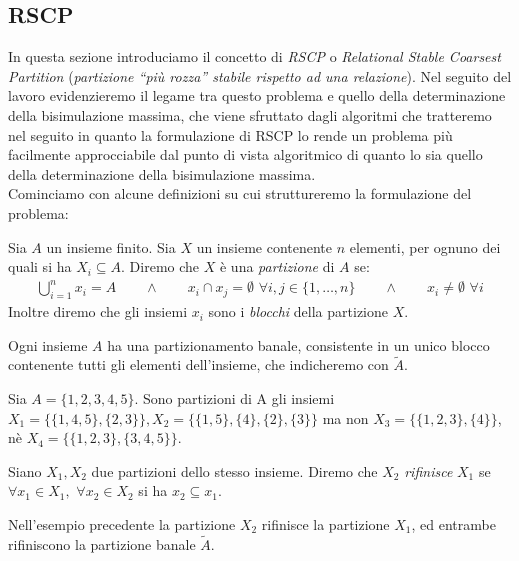 \subsection{RSCP}
In questa sezione introduciamo il concetto di \emph{RSCP} o \emph{Relational Stable Coarsest Partition} (\emph{partizione ``più rozza'' stabile rispetto ad una relazione}).
Nel seguito del lavoro evidenzieremo il legame tra questo problema e quello della determinazione della bisimulazione massima, che viene sfruttato dagli algoritmi
che tratteremo nel seguito in quanto la formulazione di RSCP lo rende un problema più facilmente approcciabile dal punto di vista algoritmico di quanto lo sia quello della determinazione della
bisimulazione massima.\\
Cominciamo con alcune definizioni su cui struttureremo la formulazione del problema:
\begin{definition}
    Sia $A$ un insieme finito. Sia $X$ un insieme contenente $n$ elementi, per ognuno dei quali si ha $X_i \subseteq A$. Diremo che $X$ è una \emph{partizione}
    di $A$ se:
    \begin{gather*}
        \bigcup_{i = 1}^n x_i = A \qquad \land \qquad x_i \cap x_j = \emptyset \,\,\forall i,j \in \{1,\dots,n\} \qquad \land \qquad x_i \neq \emptyset \,\,\forall i
    \end{gather*}
    Inoltre diremo che gli insiemi $x_i$ sono i \emph{blocchi} della partizione $X$.
\end{definition}
\begin{observation}
    Ogni insieme $A$ ha una partizionamento banale, consistente in un unico blocco contenente tutti gli elementi dell'insieme, che indicheremo con $\widetilde{A}$.
\end{observation}
\begin{example}
    Sia $A = \{1,2,3,4,5\}$. Sono partizioni di A gli insiemi $X_1 = \{\{1,4,5\},\{2,3\}\}, X_2 = \{\{1,5\},\{4\},\{2\},\{3\}\}$ ma non $X_3 = \{\{1,2,3\},\{4\}\}$,
    nè $X_4 = \{\{1,2,3\},\{3,4,5\}\}$.
    \label{exa:set_partition}
\end{example}
\begin{definition}
    Siano $X_1,X_2$ due partizioni dello stesso insieme. Diremo che $X_2$ \emph{rifinisce} $X_1$ se $\forall x_1 \in X_1, \,\,\forall x_2 \in X_2$ si ha $x_2 \subseteq x_1$.
\end{definition}
\begin{example}
    Nell'esempio precedente la partizione $X_2$ rifinisce la partizione $X_1$, ed entrambe rifiniscono la partizione banale $\widetilde{A}$.
\end{example}
